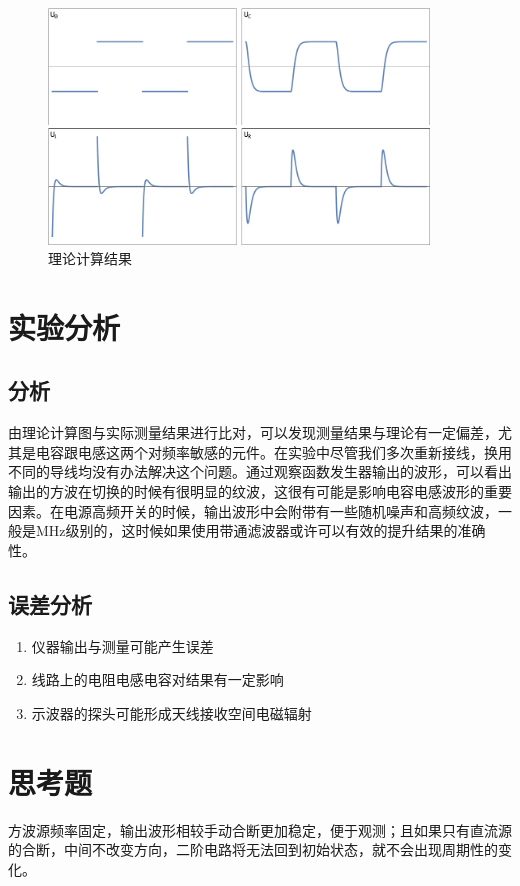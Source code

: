 \documentclass[a4paper,utf8]{article}
\begin{document}
        \begin{figure}[!ht]
            \includegraphics[width=0.9\textwidth]{3e.png}
            \caption{理论计算结果}
        \end{figure}
        \newpage
        \newpage


\section{实验分析}
    \subsection{分析}
    由理论计算图与实际测量结果进行比对，可以发现测量结果与理论有一定偏差，尤其是电容跟电感这两个对频率敏感的元件。在实验中尽管我们多次重新接线，换用不同的导线均没有办法解决这个问题。通过观察函数发生器输出的波形，可以看出输出的方波在切换的时候有很明显的纹波，这很有可能是影响电容电感波形的重要因素。在电源高频开关的时候，输出波形中会附带有一些随机噪声和高频纹波，一般是MHz级别的，这时候如果使用带通滤波器或许可以有效的提升结果的准确性。
    \subsection{误差分析}
        \begin{enumerate}
            \item 仪器输出与测量可能产生误差
            \item 线路上的电阻电感电容对结果有一定影响
            \item 示波器的探头可能形成天线接收空间电磁辐射
        \end{enumerate}
\section{思考题}
    方波源频率固定，输出波形相较手动合断更加稳定，便于观测；且如果只有直流源的合断，中间不改变方向，二阶电路将无法回到初始状态，就不会出现周期性的变化。
\end{document}
